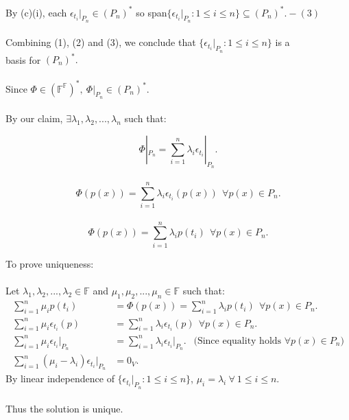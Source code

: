 \documentclass{article}
\begin{document}
By (c)(i), each $\epsilon_{t_i}|_{P_n} \in (P_n)^*$ so span$\{\epsilon_{t_i}|_{P_n} : 1\leq i \leq n\} \subseteq (P_n)^*. - (3)$\\\\
Combining (1), (2) and (3), we conclude that $\{\epsilon_{t_i}|_{P_n} : 1 \leq i \leq n\}$ is a\\basis for $(P_n)^*.$\\\\
Since $\Phi \in (\mathbb{F}^\mathbb{F})^*,\ \Phi|_{P_n} \in (P_n)^*.$\\\\
By our claim, $\exists \lambda_1, \lambda_2, ... , \lambda_n$ such that:\begin{center}
    $$\Phi|_{P_n} = \sum^n_{i=1} \lambda_i\epsilon_{t_i}|_{P_n}. $$\\
    $$\Phi(p(x)) = \sum^n_{i=1} \lambda_i\epsilon_{t_i}(p(x))\ \ \forall p(x) \in P_n. $$\\
    $$\Phi(p(x)) = \sum^n_{i=1} \lambda_ip(t_i) \ \ \forall p(x) \in P_n. $$ 
\end{center}
To prove uniqueness:\\\\
Let $\lambda_1,\lambda_2,...,\lambda_2\in\mathbb{F}$ and $\mu_1,\mu_2,...,\mu_n\in\mathbb{F}$ such that:\begin{align*}
    \sum^n_{i=1} \mu_ip(t_i) &= \Phi(p(x)) = \sum^n_{i=1} \lambda_ip(t_i) \ \ \forall p(x) \in P_n.  \\
    \sum^n_{i=1} \mu_i\epsilon_{t_i}(p) &= \sum^n_{i=1} \lambda_i\epsilon_{t_i}(p) \ \ \forall p(x) \in P_n.\\    \sum^n_{i=1} \mu_i\epsilon_{t_i}|_{P_n} &= \sum^n_{i=1} \lambda_i\epsilon_{t_i}|_{P_n}.\ \  \text{ (Since equality holds $\forall p(x) \in P_n$)} \\
    \sum^n_{i=1} (\mu_i-\lambda_i)\epsilon_{t_i}|_{P_n} &= 0_V. 
\end{align*}
By linear independence of $\{\epsilon_{t_i}|_{P_n} : 1 \leq i \leq n\}$, $\mu_i = \lambda_i \ \forall\ 1 \leq i \leq n$.\\\\
Thus the solution is unique.
\end{document}
